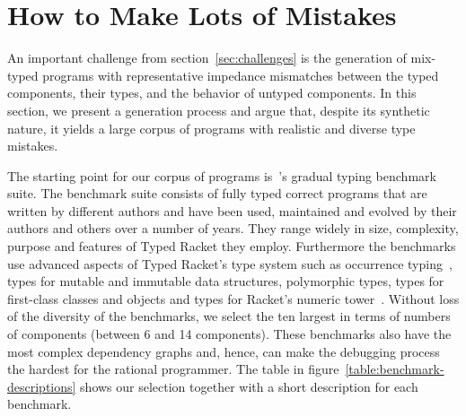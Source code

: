 \section{How to Make Lots of Mistakes} \label{sec:mutate}

An important challenge from section~\ref{sec:challenges} is the generation of
mix-typed programs with representative impedance mismatches between
the typed components, their types, and the behavior of untyped components. In this section, we
present a generation process and argue that, despite its synthetic
nature, it yields a large corpus of programs with  realistic and diverse type mistakes.

The starting point for our corpus of programs
is~\citet{gtnffvf-jfp-2019}'s gradual typing benchmark suite. The
benchmark suite consists of fully typed correct programs that are written by different authors
and have been used, maintained and evolved by their authors and others over a
number of years.  They range widely in size, complexity, purpose and
features of Typed Racket they employ.  Furthermore the benchmarks use advanced aspects 
of Typed Racket's type system such as occurrence
typing~\cite{tf-icfp-2010}, types for mutable and immutable data
structures, polymorphic types, types for first-class classes and objects and types for
Racket's numeric tower~\cite{stathff-padl-12}. Without loss of the diversity of the benchmarks,
we select the ten largest in terms of numbers of components (between 6 and 14 components).
These benchmarks also have the most complex dependency graphs and, hence, 
can make the debugging process the hardest for the rational programmer. 
The table in figure~\ref{table:benchmark-descriptions} shows our selection
together with a short description for each benchmark.  


